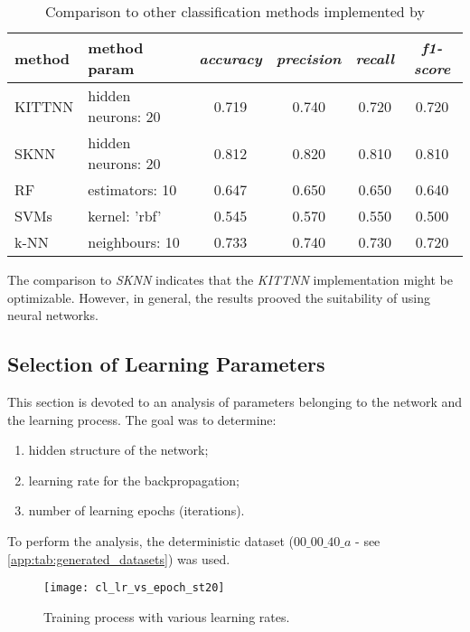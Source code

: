 \begin{table}[H]
\centering
\caption{Comparison to other classification methods implemented by \citep{article:scikit-learn}}
\label{tab:tc_comparison_to_other_classification_methods}
\begin{tabular}{|l|l|c|c|c|c|} 
\hline
method & method param & \textit{accuracy} & \textit{precision} & \textit{recall} & \textit{f1-score} \\
\hline \hline
   KITTNN 	&  hidden neurons: 20 	 &     0.719 &      0.740 &      0.720 &   0.720\\ \hline
   SKNN     &  hidden neurons: 20 	 &     0.812 &      0.820 &      0.810 &   0.810\\ \hline
   RF       &  estimators: 10		 &     0.647 &      0.650 &      0.650 &   0.640\\ \hline
   SVMs     &  kernel: 'rbf'			 &     0.545 &      0.570 &      0.550 &   0.500\\ \hline
   k-NN     &  neighbours: 10	 	 &     0.733 &      0.740 &      0.730 &   0.720\\ \hline
\hline
\end{tabular}
\end{table}

The comparison to \textit{SKNN} indicates that the \textit{KITTNN} implementation might be optimizable. However, in general, the results prooved the suitability of using neural networks.

\subsection{Selection of Learning Parameters} \label{ssec:selection_of_learning_parameters}
This section is devoted to an analysis of parameters belonging to the network and the learning process. The goal was to determine:

\begin{enumerate}
\item hidden structure of the network;
\item learning rate for the backpropagation;
\item number of learning epochs (iterations).
\end{enumerate}

To perform the analysis, the deterministic dataset ($ 00\_00\_40\_a $ - see \cref{app:tab:generated_datasets}) was used.

\begin{figure}[H]
  \centering
  \texttt{[image: cl\_lr\_vs\_epoch\_st20]}
  \caption{Training process with various learning rates.}
  \label{fig:lr_analysis}
\end{figure}

